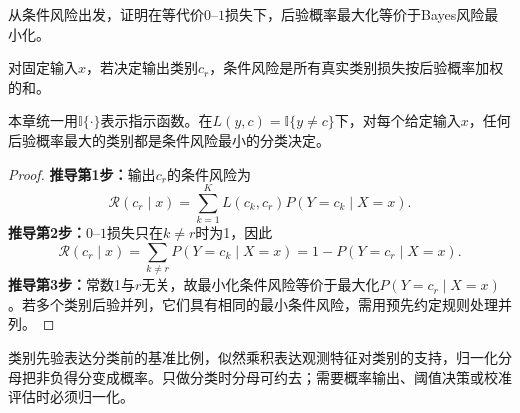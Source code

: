 \label{struct:V2-C03-CH11}

\begin{derivationgoalbox}
从条件风险出发，证明在等代价$0$--$1$损失下，后验概率最大化等价于Bayes风险最小化。
\end{derivationgoalbox}
\begin{derivationprepbox}
对固定输入$x$，若决定输出类别$c_r$，条件风险是所有真实类别损失按后验概率加权的和。
\end{derivationprepbox}

\label{struct:V2-C03-CH12}
\begin{theorem}[后验最大化的Bayes最优性]\label{thm:V2-C03-map}
本章统一用$\mathbb I\{\cdot\}$表示指示函数。在$L(y,c)=\mathbb I\{y\ne c\}$下，对每个给定输入$x$，任何后验概率最大的类别都是条件风险最小的分类决定。
\end{theorem}

\label{struct:V2-C03-CH13}

\begin{proof}
\textbf{推导第1步：}输出$c_r$的条件风险为
\[
\mathcal R(c_r\mid x)=\sum_{k=1}^{K}L(c_k,c_r)P(Y=c_k\mid X=x).
\]
\textbf{推导第2步：}$0$--$1$损失只在$k\ne r$时为1，因此
\[
\mathcal R(c_r\mid x)=\sum_{k\ne r}P(Y=c_k\mid X=x)
=1-P(Y=c_r\mid X=x).
\]
\textbf{推导第3步：}常数1与$r$无关，故最小化条件风险等价于最大化$P(Y=c_r\mid X=x)$。若多个类别后验并列，它们具有相同的最小条件风险，需用预先约定规则处理并列。
\end{proof}

\label{struct:V2-C03-CH15}
\begin{probabilitybox}
类别先验表达分类前的基准比例，似然乘积表达观测特征对类别的支持，归一化分母把非负得分变成概率。只做分类时分母可约去；需要概率输出、阈值决策或校准评估时必须归一化。
\end{probabilitybox}



